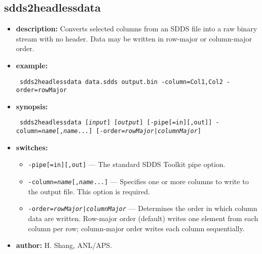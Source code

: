 \newpage
\subsection{sdds2headlessdata}
\label{sdds2headlessdata}

\begin{itemize}
\item {\bf description:} Converts selected columns from an SDDS file into a raw binary stream with no header. Data may be written in row-major or column-major order.
\item {\bf example:}
\begin{flushleft}{\tt
sdds2headlessdata data.sdds output.bin -column=Col1,Col2 -order=rowMajor
}\end{flushleft}
\item {\bf synopsis:}
\begin{flushleft}{\tt
sdds2headlessdata [{\em input}] [{\em output}] [-pipe[=in][,out]] -column={\em name}[,{\em name}...] [-order={\em rowMajor|columnMajor}]
}\end{flushleft}
\item {\bf switches:}
    \begin{itemize}
    \item {\tt -pipe[=in][,out]} --- The standard SDDS Toolkit pipe option.
    \item {\tt -column={\em name}[,{\em name}...]} --- Specifies one or more columns to write to the output file. This option is required.
    \item {\tt -order={\em rowMajor|columnMajor}} --- Determines the order in which column data are written. Row-major order (default) writes one element from each column per row; column-major order writes each column sequentially.
    \end{itemize}
\item {\bf author:} H. Shang, ANL/APS.
\end{itemize}
